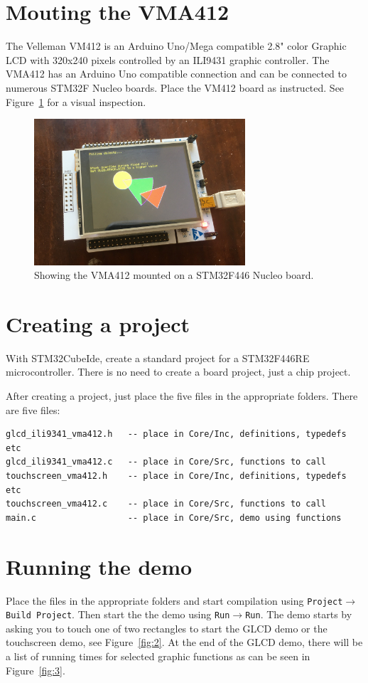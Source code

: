 \documentclass[12pt]{article}
\begin{document}
\section{Mouting the VMA412}
The Velleman VM412 is an Arduino Uno/Mega compatible 2.8" color Graphic LCD with 320x240 pixels controlled by an ILI9431 graphic controller.
The VMA412 has an Arduino Uno compatible connection and can be connected to numerous STM32F Nucleo boards.
Place the VM412 board as instructed. See Figure~\ref{fig:1} for a visual inspection.

\begin{figure}[!ht]
\centering
\includegraphics[width=0.7\textwidth]{glcd_demo}
\caption{Showing the VMA412 mounted on a STM32F446 Nucleo board.}
\label{fig:1}
\end{figure}



\section{Creating a project}
With STM32CubeIde, create a standard project for a STM32F446RE microcontroller. There is no need to
create a board project, just a chip project. 

After creating a project, just place the five files in the appropriate folders. There are five files:

\begin{lstlisting}
glcd_ili9341_vma412.h   -- place in Core/Inc, definitions, typedefs etc
glcd_ili9341_vma412.c   -- place in Core/Src, functions to call
touchscreen_vma412.h    -- place in Core/Inc, definitions, typedefs etc
touchscreen_vma412.c    -- place in Core/Src, functions to call
main.c                  -- place in Core/Src, demo using functions
\end{lstlisting}

\section{Running the demo}
Place the files in the appropriate folders and start compilation using \texttt{Project}$\rightarrow$\texttt{Build Project}.
Then start the the demo using \texttt{Run}$\rightarrow$\texttt{Run}. The demo starts by asking you to touch one of two rectangles to start the GLCD demo or the touchscreen demo, see Figure~\ref{fig:2}. At the end of the GLCD demo, there will be a list of running times for selected graphic functions as can be seen in Figure~\ref{fig:3}.
\end{document}
